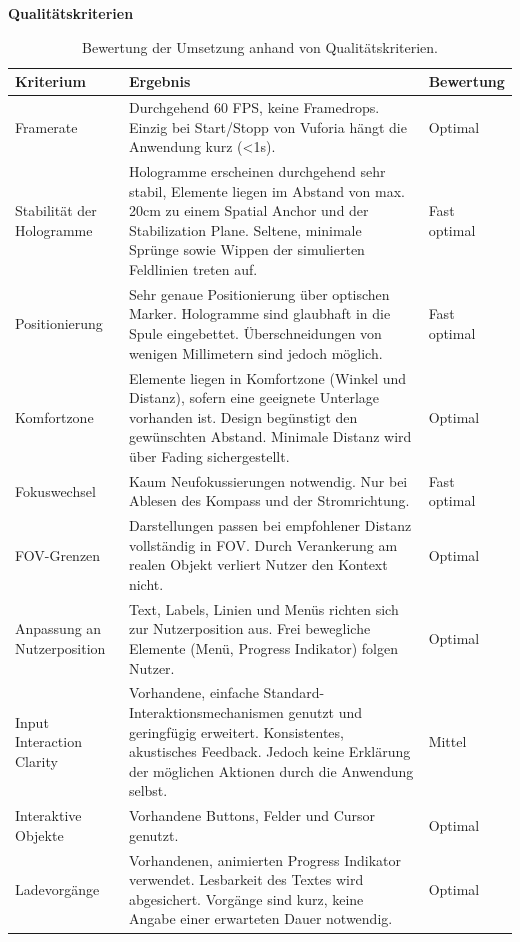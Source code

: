 \textbf{Qualitätskriterien}
\begin{landscape}
	\bgroup
	\setlength\extrarowheight{-2pt}
	\def\arraystretch{1.8}
	\begin{table}
		\centering
		\begin{tabular}{m{2.3cm}|m{15.5cm}|m{2cm}}
			Kriterium & Ergebnis & Bewertung\\
			\hline
			\hline
			Framerate & Durchgehend 60 FPS, keine Framedrops. Einzig bei Start/Stopp von Vuforia hängt die Anwendung kurz (<1s). & Optimal\\
			\hline
			Stabilität der Hologramme & Hologramme erscheinen durchgehend sehr stabil, Elemente liegen im Abstand von max. 20cm zu einem Spatial Anchor und der Stabilization Plane. Seltene, minimale Sprünge sowie Wippen der simulierten Feldlinien treten auf. & Fast optimal\\
			\hline
			Positionierung & Sehr genaue Positionierung über optischen Marker. Hologramme sind glaubhaft in die Spule eingebettet. Überschneidungen von wenigen Millimetern sind jedoch möglich. & Fast optimal\\
			\hline
			Komfortzone & Elemente liegen in Komfortzone (Winkel und Distanz), sofern eine geeignete Unterlage vorhanden ist. Design begünstigt den gewünschten Abstand. Minimale Distanz wird über Fading sichergestellt. & Optimal\\
			\hline
			Fokuswechsel & Kaum Neufokussierungen notwendig. Nur bei Ablesen des Kompass und der Stromrichtung. & Fast optimal\\
			\hline
			FOV-Grenzen & Darstellungen passen bei empfohlener Distanz vollständig in FOV. Durch Verankerung am realen Objekt verliert Nutzer den Kontext nicht. & Optimal\\
			\hline
			Anpassung an Nutzerposition & Text, Labels, Linien und Menüs richten sich zur Nutzerposition aus. Frei bewegliche Elemente (Menü, Progress Indikator) folgen Nutzer. & Optimal\\
			\hline
			Input Interaction Clarity & Vorhandene, einfache Standard-Interaktionsmechanismen genutzt und geringfügig erweitert. Konsistentes, akustisches Feedback. Jedoch keine Erklärung der möglichen Aktionen durch die Anwendung selbst. & Mittel\\
			\hline
			Interaktive Objekte & Vorhandene Buttons, Felder und Cursor genutzt. & Optimal\\
			\hline
			Ladevorgänge & Vorhandenen, animierten Progress Indikator verwendet. Lesbarkeit des Textes wird abgesichert. Vorgänge sind kurz, keine Angabe einer erwarteten Dauer notwendig. & Optimal\\
		\end{tabular}\caption{\label{tab:tech_results} Bewertung der Umsetzung anhand von Qualitätskriterien.}
	\end{table}
	\egroup
\end{landscape}

